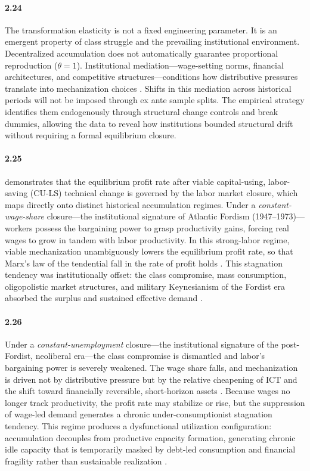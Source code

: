 \paragraph{2.24}
The transformation elasticity is not a fixed
engineering parameter. It is an emergent property of class
struggle and the prevailing institutional environment.
Decentralized accumulation does not automatically guarantee
proportional reproduction ($\theta = 1$). Institutional
mediation---wage-setting norms, financial architectures, and
competitive structures---conditions how distributive pressures
translate into mechanization choices
\citep{Aglietta2000, VidalPeck2012}. Shifts in this
mediation across historical periods will not be imposed
through ex ante sample splits. The empirical strategy
identifies them endogenously through structural change
controls and break dummies, allowing the data to reveal how
institutions bounded structural drift without requiring a
formal equilibrium closure.

\paragraph{2.25}
\citet{Basu2026} demonstrates that the equilibrium profit
rate after viable capital-using, labor-saving (CU-LS)
technical change is governed by the labor market closure,
which maps directly onto distinct historical accumulation
regimes. Under a \textit{constant-wage-share} closure---the
institutional signature of Atlantic Fordism
(1947--1973)---workers possess the bargaining power to grasp
productivity gains, forcing real wages to grow in tandem with
labor productivity. In this strong-labor regime, viable
mechanization unambiguously lowers the equilibrium profit
rate, so that Marx's law of the tendential fall in the rate
of profit holds \citep{Basu2026}. This stagnation tendency
was institutionally offset: the class compromise, mass
consumption, oligopolistic market structures, and military
Keynesianism of the Fordist era absorbed the surplus and
sustained effective demand \citep{Vidal2019}.

\paragraph{2.26}
Under a \textit{constant-unemployment} closure---the
institutional signature of the post-Fordist, neoliberal
era---the class compromise is dismantled and labor's
bargaining power is severely weakened. The wage share falls,
and mechanization is driven not by distributive pressure but
by the relative cheapening of ICT and the shift toward
financially reversible, short-horizon assets
\citep{Lapavitsas2011, Pagano2014}. Because wages no longer
track productivity, the profit rate may stabilize or rise,
but the suppression of wage-led demand generates a chronic
under-consumptionist stagnation tendency. This regime
produces a dysfunctional utilization configuration:
accumulation decouples from productive capacity formation,
generating chronic idle capacity that is temporarily masked
by debt-led consumption and financial fragility rather than
sustainable realization \citep{Stockhammer2012, Vidal2019}.

